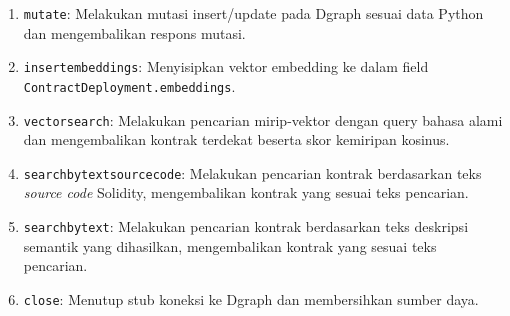 \begin{enumerate}
    \item \texttt{mutate}: Melakukan mutasi insert/update pada Dgraph sesuai data Python dan mengembalikan respons mutasi.
    \item \texttt{insert\textunderscore embeddings}: Menyisipkan vektor embedding ke dalam field \\\texttt{ContractDeployment.embeddings}.
    \item \texttt{vector\textunderscore search}: Melakukan pencarian mirip-vektor dengan query bahasa alami dan mengembalikan kontrak terdekat beserta skor kemiripan kosinus.
    \item \texttt{search\textunderscore by\textunderscore text\textunderscore source\textunderscore code}: Melakukan pencarian kontrak berdasarkan teks \textit{source code} Solidity, mengembalikan kontrak yang sesuai teks pencarian.
    \item \texttt{search\textunderscore by\textunderscore text}: Melakukan pencarian kontrak berdasarkan teks deskripsi semantik yang dihasilkan, mengembalikan kontrak yang sesuai teks pencarian.
    \item \texttt{close}: Menutup stub koneksi ke Dgraph dan membersihkan sumber daya.
\end{enumerate}